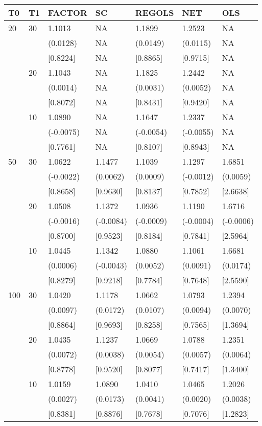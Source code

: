 \begin{table}[ht]
\centering
\begin{tabular}{lllllll}
\hline
T0&T1&FACTOR&SC&REGOLS&NET&OLS\\
\hline
20&30&1.1013&NA&1.1899&1.2523&NA\\
&&(0.0128)&NA&(0.0149)&(0.0115)&NA\\
&&[0.8224]&NA&[0.8865]&[0.9715]&NA\\
&20&1.1043&NA&1.1825&1.2442&NA\\
&&(0.0014)&NA&(0.0031)&(0.0052)&NA\\
&&[0.8072]&NA&[0.8431]&[0.9420]&NA\\
&10&1.0890&NA&1.1647&1.2337&NA\\
&&(-0.0075)&NA&(-0.0054)&(-0.0055)&NA\\
&&[0.7761]&NA&[0.8107]&[0.8943]&NA\\

50&30&1.0622&1.1477&1.1039&1.1297&1.6851\\
&&(-0.0022)&(0.0062)&(0.0009)&(-0.0012)&(0.0059)\\
&&[0.8658]&[0.9630]&[0.8137]&[0.7852]&[2.6638]\\
&20&1.0508&1.1372&1.0936&1.1190&1.6716\\
&&(-0.0016)&(-0.0084)&(-0.0009)&(-0.0004)&(-0.0006)\\
&&[0.8700]&[0.9523]&[0.8184]&[0.7841]&[2.5964]\\
&10&1.0445&1.1342&1.0880&1.1061&1.6681\\
&&(0.0006)&(-0.0043)&(0.0052)&(0.0091)&(0.0174)\\
&&[0.8279]&[0.9218]&[0.7784]&[0.7648]&[2.5590]\\

100&30&1.0420&1.1178&1.0662&1.0793&1.2394\\
&&(0.0097)&(0.0172)&(0.0107)&(0.0094)&(0.0070)\\
&&[0.8864]&[0.9693]&[0.8258]&[0.7565]&[1.3694]\\
&20&1.0435&1.1237&1.0669&1.0788&1.2351\\
&&(0.0072)&(0.0038)&(0.0054)&(0.0057)&(0.0064)\\
&&[0.8778]&[0.9520]&[0.8077]&[0.7417]&[1.3400]\\
&10&1.0159&1.0890&1.0410&1.0465&1.2026\\
&&(0.0027)&(0.0173)&(0.0041)&(0.0020)&(0.0038)\\
&&[0.8381]&[0.8876]&[0.7678]&[0.7076]&[1.2823]\\
\hline
\end{tabular}
\end{table}

